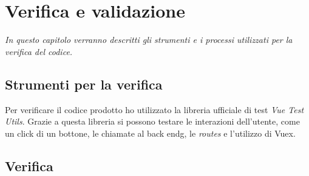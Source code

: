
\chapter{Verifica e validazione}
\label{cap:verifica-validazione}

\textit{In questo capitolo verranno descritti gli strumenti e i processi utilizzati per la verifica del codice.}

\section{Strumenti per la verifica}
\label{sec:strumenti-per-verifica}

Per verificare il codice prodotto ho utilizzato la libreria ufficiale di test \textit{Vue Test Utils}. Grazie a questa libreria si possono testare le interazioni dell'utente, come un click di un bottone, le chiamate al \gls{back endg}, le \textit{routes} e l'utilizzo di Vuex.

\section{Verifica}
\label{sec:verifica}

